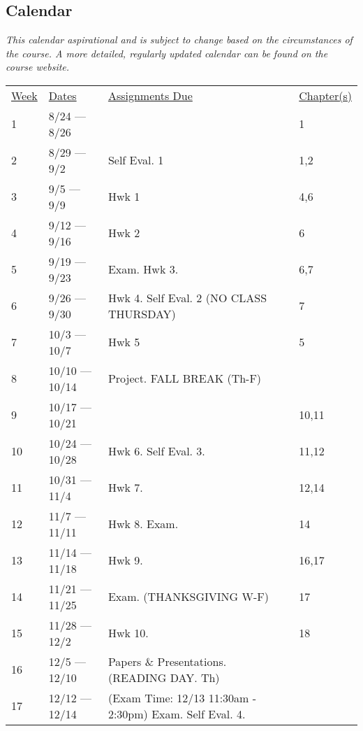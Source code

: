 \documentclass[10pt]{article}
\begin{document}
\subsection{Calendar}

\textit{This calendar aspirational and is subject to change based on the circumstances of the course. A more detailed, regularly updated calendar can be found on the course website. }


\begin{center}
\begin{tabular}{llll}
\underline{Week} & \underline{Dates} & \underline{Assignments Due} & \underline{Chapter(s)}\\
1 & 8/24 --- 8/26  &  & 1 \\
2 & 8/29 --- 9/2 & Self Eval. 1 & 1,2\\
3 & 9/5 --- 9/9 & Hwk 1  &  4,6 \\
4 & 9/12 --- 9/16  & Hwk 2 & 6 \\
5 & 9/19 --- 9/23 & Exam. Hwk 3. & 6,7 \\
6 & 9/26 --- 9/30 & Hwk 4. Self Eval. 2 (NO CLASS THURSDAY) & 7 \\
7 & 10/3 --- 10/7 & Hwk 5  & 5 \\
8 & 10/10 --- 10/14 & Project. FALL BREAK (Th-F)   &   \\
9 & 10/17 --- 10/21  &  & 10,11  \\
10 & 10/24 --- 10/28  & Hwk 6. Self Eval. 3.  & 11,12    \\
11 & 10/31 --- 11/4 & Hwk 7.  & 12,14 \\
12 & 11/7 --- 11/11 &  Hwk 8. Exam. & 14  \\
13 & 11/14 --- 11/18 & Hwk 9.  &  16,17 \\
14 & 11/21 --- 11/25 & Exam. (THANKSGIVING W-F)  &  17 \\
15 & 11/28 --- 12/2 & Hwk 10.  & 18 \\
16 & 12/5 --- 12/10 & Papers \& Presentations. (READING DAY. Th)  &  \\
17 & 12/12 --- 12/14 & (Exam Time: 12/13 11:30am - 2:30pm) Exam. Self Eval. 4. &
\end{tabular}
\end{center}
\end{document}
